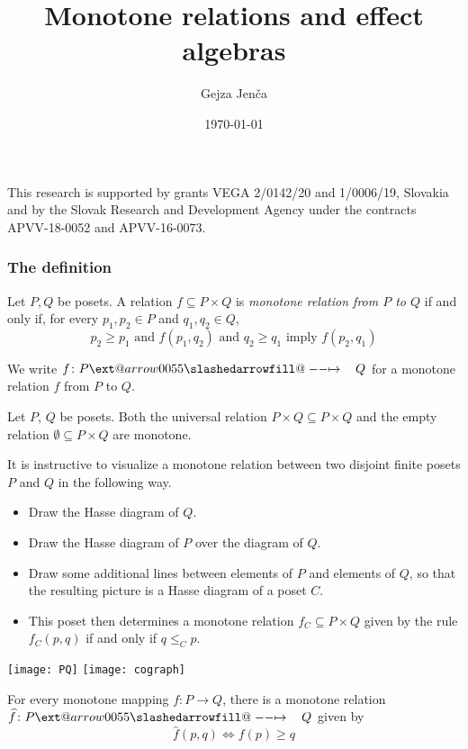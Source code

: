 \documentclass{beamer}
\title[Monotone relations and EAs]{Monotone relations and effect algebras}
\author{Gejza Jenča}
\institute[]{Slovak University of Technology Bratislava}
\date{\today}
\makeatletter
\def\slashedarrowfill@#1#2#3#4#5{%
  $\m@th\thickmuskip0mu\medmuskip\thickmuskip\thinmuskip\thickmuskip
  \relax#5#1\mkern-7mu%
  \cleaders\hbox{$#5\mkern-2mu#2\mkern-2mu$}\hfill
  \mathclap{#3}\mathclap{#2}%
  \cleaders\hbox{$#5\mkern-2mu#2\mkern-2mu$}\hfill
  \mkern-7mu#4$%
}
\def\rightslashedarrowfill@{%
  \slashedarrowfill@\relbar\relbar\mapstochar\rightarrow}
\newcommand\xslashedrightarrow[2][]{%
  \ext@arrow 0055{\rightslashedarrowfill@}{#1}{#2}}
\newcommand{\sto}{\xslashedrightarrow{\hskip 1pc}}
\makeatother
\begin{document}
\begin{frame}
\titlepage

\tiny This research is supported by grants VEGA 2/0142/20 and 1/0006/19,
Slovakia and by the Slovak Research and Development Agency under the contracts
APVV-18-0052 and APVV-16-0073.
\end{frame}
\begin{frame}
\frametitle{The definition}
\begin{definition}
Let $P,Q$ be posets. A relation $f\subseteq P\times Q$ is {\em monotone relation
from $P$ to $Q$}
if and only if, for every $p_1,p_2\in P$ and $q_1,q_2\in Q$,
$$
p_2\geq p_1\text{ and } f(p_1,q_2)\text{ and }q_2\geq q_1\text{ imply } f(p_2,q_1)
$$
\end{definition}
We write $f\colon P\sto Q$ for a monotone relation $f$ from $P$ to $Q$.
\begin{example}
Let $P$, $Q$ be posets. Both the universal 
relation $P\times Q\subseteq P\times Q$ and the empty relation $\emptyset\subseteq P\times
Q$ are monotone.
\end{example}
\end{frame}

\begin{frame}
It is instructive to visualize a monotone relation between two disjoint finite
posets $P$ and $Q$ in the following way.
\begin{itemize}
\item Draw the Hasse diagram of $Q$.\pause
\item Draw the Hasse diagram of $P$ over the diagram of $Q$.\pause
\item Draw some additional lines between elements of $P$ and elements of $Q$,\pause
so that the resulting picture is a Hasse diagram of a poset $C$.\pause
\item This poset then determines a monotone relation $f_C\subseteq P\times Q$ 
given by the rule $f_C(p,q)$ if and only if $q\leq_C p$.
\end{itemize}
\end{frame}
\begin{frame}
\begin{center}
\texttt{[image: PQ]}
\texttt{[image: cograph]}
\end{center}
\end{frame}
\begin{frame}
For every monotone mapping $f\colon P\to Q$, there is a monotone relation
$\widehat f\colon P\sto Q$ given by
$$
\widehat f(p,q)\Leftrightarrow f(p)\geq q
$$
\end{frame}
\end{document}
